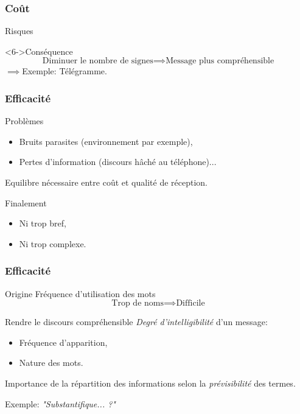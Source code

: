 \begin{frame}
	\frametitle{Coût}
	\begin{alertblock}{Risques}
		\centering
	\end{alertblock}
	\begin{exampleblock}<6->{Conséquence}
		\[ \text{Diminuer le nombre de signes} \implies \text{Message plus compréhensible} \]
		$\implies$Exemple: Télégramme.
	\end{exampleblock}
\end{frame}
\begin{frame}
	\frametitle{Efficacité}
	\begin{alertblock}{Problèmes}
		\begin{itemize}
			\item Bruits parasites (environnement par exemple),
			\item Pertes d'information (discours hâché au téléphone)...
		\end{itemize}
		Equilibre nécessaire entre coût et qualité de réception.
	\end{alertblock}
	\pause
	\begin{block}{Finalement}
		\begin{itemize}
			\item Ni trop bref,
			\item Ni trop complexe.
		\end{itemize}
	\end{block}
\end{frame}
\begin{frame}
	\frametitle{Efficacité}
	\begin{exampleblock}{Origine}
		Fréquence d'utilisation des mots
		\[ \text{Trop de noms} \implies \text{Difficile} \]
	\end{exampleblock}
	\pause
	\begin{block}{Rendre le discours compréhensible}
		\emph{Degré d'intelligibilité} d'un message:
		\begin{itemize}
			\item Fréquence d'apparition,
			\item Nature des mots.
		\end{itemize} \pause
		Importance de la répartition des informations selon la \emph{prévisibilité} des termes.

		\vspace{0.2cm}
		Exemple: {\itshape"Substantifique... ?"}
	\end{block}
\end{frame}
